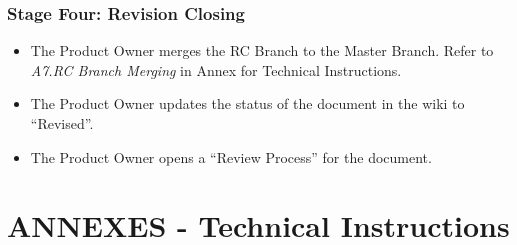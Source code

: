 \documentclass{template/openetcs_article}
\begin{document}
\subsubsection{Stage Four: Revision Closing}
\begin{itemize}
\item The Product Owner merges the RC Branch to the Master Branch. Refer to {\it A7.RC Branch Merging} in Annex for Technical Instructions.
\item The Product Owner updates the status of the document in the wiki to “Revised”. 
\item The Product Owner opens a “Review Process” for the document.
\end{itemize}

\section{ANNEXES - Technical Instructions}
\end{document}
